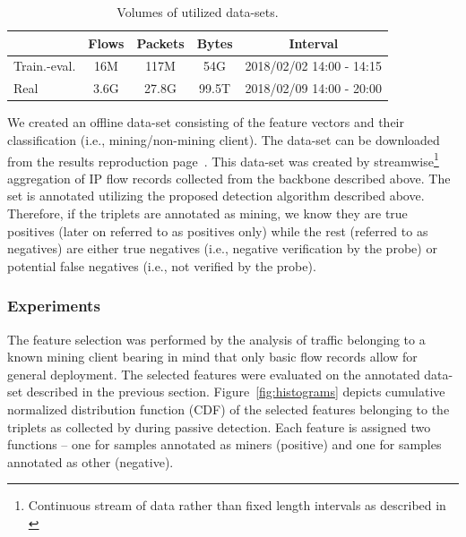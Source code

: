 \documentclass[preprint,12pt,3p]{elsarticle}
\begin{document}
\begin{table}[t!]
    \begin{center}
        \begin{tabular}{|l|c|c|c|c|}
        \hline
        &Flows & Packets & Bytes & Interval \\
        \hline
        Train.-eval.  & 16M & 117M & 54G & 2018/02/02 14:00 - 14:15\\
        Real      & 3.6G & 27.8G & 99.5T & 2018/02/09 14:00 - 20:00\\
        \hline
        \end{tabular}
    \caption{Volumes of utilized data-sets.}
    \label{tab:char}
    \end{center}
\end{table}
 
We created an offline data-set consisting of the feature vectors and their classification (i.e., mining/non-mining client). The data-set can be downloaded from the results reproduction page~\cite{GITHUB-REPRO}. This data-set was created by streamwise\footnote{Continuous stream of data rather than fixed length intervals as described in \cite{nemea}} aggregation of IP flow records collected from the backbone described above. The set is annotated utilizing the proposed detection algorithm described above. Therefore, if the triplets are annotated as mining, we know they are true positives (later on referred to as positives only) while the rest (referred to as negatives) are either true negatives (i.e., negative verification by the probe) or potential false negatives (i.e., not verified by the probe).

\subsubsection{Experiments}
\label{subsubsec432}

The feature selection was performed by the analysis of traffic belonging to a known mining client bearing in mind that only basic flow records allow for general deployment. 
The selected features were evaluated on the annotated data-set described in the previous section.
Figure~\ref{fig:histograms} depicts cumulative normalized distribution function (CDF) of the selected features belonging to the triplets as collected by during passive detection. 
Each feature is assigned two functions -- one for samples annotated as miners (positive) and one for samples annotated as other (negative).
\end{document}
